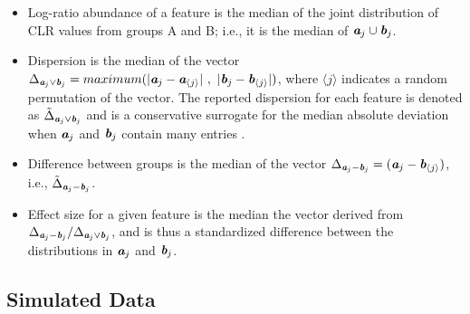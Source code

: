 \documentclass[10pt]{article}
\begin{document}
 
\begin{itemize}
\item{Log-ratio abundance} of a feature is the median of the joint distribution of CLR values from  groups A and B; i.e., it is the median of $ \textit{\textbf{a}}_j \cup \textit{\textbf{b}}_j$. 

\item{Dispersion} is the median of the vector $\Delta_{\textit{\textbf{a}}_j\lor \textit{\textbf{b}}_j}  = maximum(|\textit{\textbf{a}}_{j} - \textit{\textbf{a}}_{\langle j \rangle}|~,~|\textit{\textbf{b}}_{j} -\textit{\textbf{b}}_{\langle j \rangle}| )$, where $\langle j \rangle$ indicates a random permutation of the vector. The reported dispersion for each feature is denoted as $\tilde{\Delta}_{\textit{\textbf{a}}_j\lor \textit{\textbf{b}}_j}$ and is a conservative surrogate for the median absolute deviation when $\textit{\textbf{a}}_j$ and $\textit{\textbf{b}}_j$ contain many entries . 

\item{Difference} between groups is the median of the vector $\Delta_{\textit{\textbf{a}}_j-\textit{\textbf{b}}_j}  = (\textit{\textbf{a}}_{j} - \textit{\textbf{b}}_{\langle j \rangle})$, i.e., $\tilde{\Delta}_{\textit{\textbf{a}}_j-\textit{\textbf{b}}_j}$.

\item{Effect size} for a given feature is the median  the vector derived from $\Delta_{\textit{\textbf{a}}_j-\textit{\textbf{b}}_j} / \Delta_{\textit{\textbf{a}}_j\lor \textit{\textbf{b}}_j}$, and is thus a standardized difference between the distributions in $\textit{\textbf{a}}_{j}$ and $\textit{\textbf{b}}_{j}$.
\end{itemize}

\subsection{Simulated Data}
\vskip-0.25cm
\end{document}
